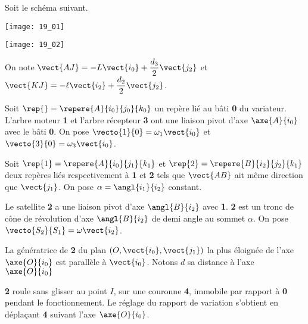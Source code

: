 \normalfalse \difficilefalse \tdifficiletrue
\correctionfalse



\setcounter{question}{0}
\ifcorrection
\else
{}
\fi

\ifprof
\else

Soit le schéma suivant. 
\begin{marginfigure}
\texttt{[image: 19\_01]}

\texttt{[image: 19\_02]}
\end{marginfigure}

On note
$\vect{AJ}=-L \vect{i_0}+\dfrac{d_3}{2}\vect{j_2}$
et 
$\vect{KJ}=-\ell \vect{i_2}+\dfrac{d_2}{2}\vect{j_2}$.

Soit $\rep{}=\repere{A}{i_0}{j_0}{k_0}$ un repère lié au bâti \textbf{0} du variateur. L’arbre moteur \textbf{1} et l’arbre récepteur
\textbf{3} ont une liaison pivot d’axe $\axe{A}{i_0}$ avec le bâti \textbf{0}. On pose $\vecto{1}{0}=\omega_1\vect{i_0}$ et $\vecto{3}{0}=\omega_3\vect{i_0}$. 

Soit $\rep{1}=\repere{A}{i_0}{j_1}{k_1}$  et $\rep{2}=\repere{B}{i_2}{j_2}{k_1}$ deux repères liés respectivement à \textbf{1} et \textbf{2} tels que $\vect{AB}$ ait même direction que  $\vect{j_1}$. On pose $\alpha =  \angl{i_1}{i_2}$ constant. 

Le satellite \textbf{2} a une liaison pivot d’axe $\angl{B}{i_2}$ avec \textbf{1}. \textbf{2} est un tronc de cône de
révolution d’axe $\angl{B}{i_2}$ de demi angle au sommet $\alpha$. On pose $\vecto{S_2}{S_1}=\omega\vect{i_2}$.

La génératrice de \textbf{2} du plan $\left(O,\vect{i_0},\vect{j_1} \right)$  la plus éloignée de l’axe $\axe{O}{i_0}$
 est parallèle à $\vect{i_0}$. Notons $d$ sa distance à l’axe $\axe{O}{i_0}$

\textbf{2} roule sans glisser au point $I$, sur une couronne \textbf{4}, immobile par rapport à \textbf{0} pendant le
fonctionnement. Le réglage du rapport de variation s’obtient en déplaçant \textbf{4} suivant l’axe
$\axe{O}{i_0}$.

